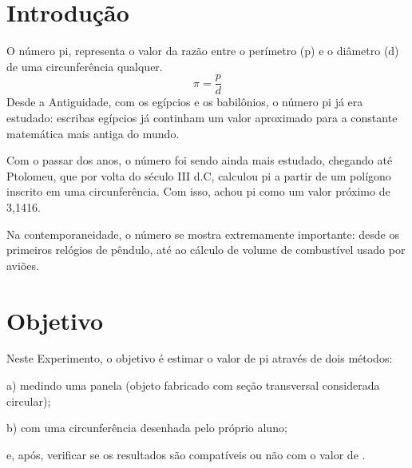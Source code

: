 \documentclass[11pt, letterpaper]{article}
\begin{document}
\newpage
\listoftables
\newpage
\section{Introdução}
O número pi, representa o valor da razão entre o perímetro (p) e o diâmetro (d) de uma circunferência qualquer.
\begin{equation}
\pi = \frac{p}{d}
\end{equation}
Desde a Antiguidade, com os egípcios e os babilônios, o número pi já era estudado: escribas egípcios já continham um valor aproximado para a constante matemática mais antiga do mundo.


Com o passar dos anos, o número foi sendo ainda mais estudado, chegando até Ptolomeu, que por volta do século III d.C, calculou pi a partir de um polígono inscrito em uma circunferência. Com isso, achou pi como um valor próximo de 3,1416.


Na contemporaneidade, o número se mostra extremamente importante: desde os primeiros relógios de pêndulo, até ao cálculo de volume de combustível usado por aviões.
\section{Objetivo}

Neste Experimento, o objetivo é estimar o valor de pi através de dois métodos:

a) medindo uma panela (objeto fabricado com seção transversal considerada circular);


b) com uma circunferência desenhada pelo próprio aluno;

e, após, verificar se os resultados são compatíveis ou não com o valor de \pi .

\end{document}
